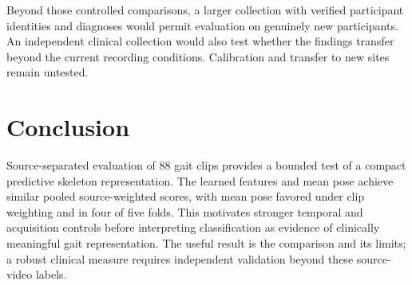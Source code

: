 \documentclass[10pt,twocolumn,letterpaper]{article}
\begin{document}
Beyond those controlled comparisons, a larger collection with verified participant identities and diagnoses would permit evaluation on genuinely new participants. An independent clinical collection would also test whether the findings transfer beyond the current recording conditions. Calibration and transfer to new sites remain untested.

\section{Conclusion}
Source-separated evaluation of 88 gait clips provides a bounded test of a compact predictive skeleton representation. The learned features and mean pose achieve similar pooled source-weighted scores, with mean pose favored under clip weighting and in four of five folds. This motivates stronger temporal and acquisition controls before interpreting classification as evidence of clinically meaningful gait representation. The useful result is the comparison and its limits; a robust clinical measure requires independent validation beyond these source-video labels.

{\small


}
\end{document}
